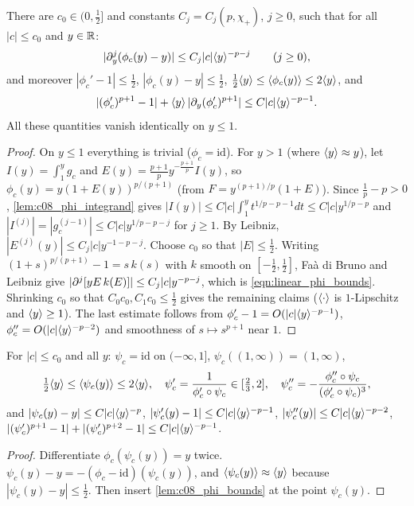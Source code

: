 \begin{lemma}
  \label{lem:c08_phi_bounds}
  There are $c_0\in(0,\frac12]$ and constants $C_j=C_j(p,\chi_+)$, $j\ge0$, such that for all $|c|\le c_0$
  and $y\in\mathbb{R}$:
  \begin{equation}\label{eqn:linear_phi_bounds}
    |\partial_y^j(\phi_c(y)-y)|\le C_j|c|\langle y \rangle^{-p-j}\qquad(j\ge0),
  \end{equation}
  and moreover $|\phi_c'-1|\le\frac12$, $|\phi_c(y)-y|\le\frac12$, $\frac12\langle y \rangle\le\langle \phi_c(y) \rangle\le2\langle y \rangle$, and
  \[
    |(\phi_c')^{p+1}-1|+\langle y \rangle\,|\partial_y(\phi_c')^{p+1}|\le C|c|\langle y \rangle^{-p-1}.
  \]
  All these quantities vanish identically on $y\le1$.
\end{lemma}
\begin{proof}
  On $y\le1$ everything is trivial ($\phi_c=\mathrm{id}$). For $y>1$ (where $\langle y \rangle\approx y$), let
  $I(y)=\int_1^yg_c$ and $E(y)=\frac{p+1}py^{-\frac{p+1}p}I(y)$, so $\phi_c(y)=y(1+E(y))^{p/(p+1)}$ (from
  $F=y^{(p+1)/p}(1+E)$). Since $\frac1p-p>0$, \cref{lem:c08_phi_integrand} gives
  $|I(y)|\le C|c|\int_1^yt^{1/p-p-1}dt\le C|c|y^{1/p-p}$ and $|I^{(j)}|=|g_c^{(j-1)}|\le C|c|y^{1/p-p-j}$ for $j\ge1$.
  By Leibniz, $|E^{(j)}(y)|\le C_j|c|y^{-1-p-j}$. Choose $c_0$ so that $|E|\le\frac12$. Writing
  $(1+s)^{p/(p+1)}-1=s\,k(s)$ with $k$ smooth on $[-\frac12,\frac12]$, Faà di Bruno and Leibniz give
  $|\partial^j[yE\,k(E)]|\le C_j|c|y^{-p-j}$, which is \eqref{eqn:linear_phi_bounds}. Shrinking $c_0$ so that
  $C_0c_0,C_1c_0\le\frac12$ gives the remaining claims ($\langle \cdot \rangle$ is $1$-Lipschitz and
  $\langle y \rangle\ge1$). The last estimate follows from $\phi_c'-1=O(|c|\langle y \rangle^{-p-1})$,
  $\phi_c''=O(|c|\langle y \rangle^{-p-2})$ and smoothness of $s\mapsto s^{p+1}$ near $1$.
\end{proof}

\begin{lemma}[Bounds for $\psi_c=\phi_c^{-1}$]
  \label{lem:c08_psi_bounds}
  For $|c|\le c_0$ and all $y$: $\psi_c=\mathrm{id}$ on $(-\infty,1]$, $\psi_c((1,\infty))=(1,\infty)$,
  \begin{equation}\label{eqn:linear_inverse_phi_bounds}
    \tfrac12\langle y \rangle\le\langle \psi_c(y) \rangle\le2\langle y \rangle,\quad \psi_c'=\frac1{\phi_c'\circ\psi_c}\in[\tfrac23,2],\quad
    \psi_c''=-\frac{\phi_c''\circ\psi_c}{(\phi_c'\circ\psi_c)^3},
  \end{equation}
  and $|\psi_c(y)-y|\le C|c|\langle y \rangle^{-p}$, $|\psi_c'(y)-1|\le C|c|\langle y \rangle^{-p-1}$, $|\psi_c''(y)|\le C|c|\langle y \rangle^{-p-2}$,
  $|(\psi_c')^{p+1}-1|+|(\psi'_c)^{p+2}-1|\le C|c|\langle y \rangle^{-p-1}$.
\end{lemma}
\begin{proof}
  Differentiate $\phi_c(\psi_c(y))=y$ twice. $\psi_c(y)-y=-(\phi_c-\mathrm{id})(\psi_c(y))$, and
  $\langle \psi_c(y) \rangle\approx\langle y \rangle$ because $|\psi_c(y)-y|\le\frac12$. Then insert \cref{lem:c08_phi_bounds}
  at the point $\psi_c(y)$.
\end{proof}


